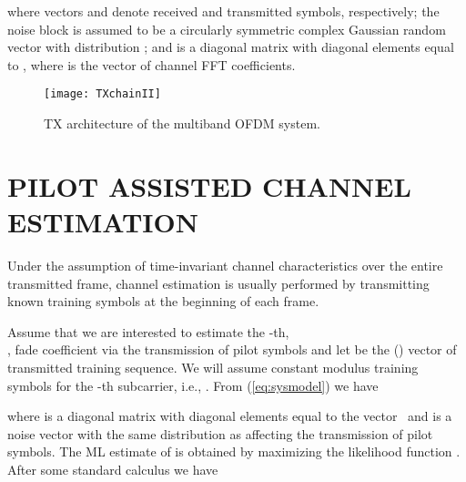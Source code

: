 \documentclass{article}
\begin{document}
where  vectors  and  denote received and transmitted symbols, respectively; the noise block  is assumed to be a circularly symmetric complex Gaussian random vector with distribution ; and  is a diagonal matrix with diagonal elements equal to , where  is the vector of channel FFT coefficients.  

\begin{figure}[!t]
\centering
{}
\texttt{[image: TXchainII]}
\caption{TX architecture of the multiband OFDM system.}\label{fig1}
\end{figure}
\section{PILOT ASSISTED CHANNEL ESTIMATION}
\label{sec:pilot}
Under the assumption of time-invariant channel characteristics over the entire transmitted frame, channel estimation is usually performed by transmitting known training symbols at the beginning of each frame. 

Assume that we are interested to estimate the -th, \\, fade coefficient  via the transmission of  pilot symbols and let  be the () vector of transmitted training sequence. We will assume constant modulus training symbols for the -th subcarrier, i.e., . From (\ref{eq:sysmodel}) we have 
         
where  is a diagonal matrix with diagonal elements equal to the  vector \,  and  is a noise vector with the same distribution as  affecting the transmission of pilot symbols. The ML estimate of  is obtained by maximizing the likelihood function . After some standard calculus we have
\end{document}
